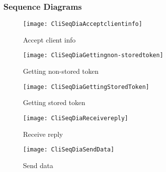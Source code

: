 	\subsubsection{Sequence Diagrams}\label{Client Sequence Diagrams}
		\begin{figure}[H]
			\centering	
			\texttt{[image: CliSeqDiaAcceptclientinfo]}
			\caption{Accept client info}
			\label{fig:CliSeqDiaAcceptclientinfo}
		\end{figure}
		\begin{figure}[H]
			\centering	
			\texttt{[image: CliSeqDiaGettingnon-storedtoken]}
			\caption{Getting non-stored token}
			\label{fig:CliSeqDiaGettingnon-storedtoken}
		\end{figure}
		\begin{figure}[H]
			\centering	
			\texttt{[image: CliSeqDiaGettingStoredToken]}
			\caption{Getting stored token}
			\label{fig:CliSeqDiaGettingStoredToken}
		\end{figure}
		\begin{figure}[H]
			\centering	
			\texttt{[image: CliSeqDiaReceivereply]}
			\caption{Receive reply}
			\label{fig:CliSeqDiaReceivereply}
		\end{figure}
		\begin{figure}[H]
			\centering	
			\texttt{[image: CliSeqDiaSendData]}
			\caption{Send data}
			\label{fig:CliSeqDiaSendData}
		\end{figure}

		

